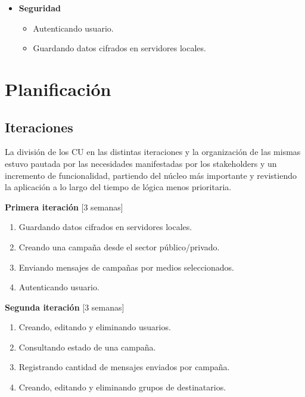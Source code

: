 \documentclass[a4paper, 10pt, twoside]{article}
\begin{document}
\begin{itemize}
\item \textbf{Seguridad}
\begin{itemize}
\item Autenticando usuario.
\item Guardando datos cifrados en servidores locales.
\end{itemize}
\end{itemize}

\newpage


\section{Planificación}

\subsection{Iteraciones}
La división de los CU en las distintas iteraciones y la organización de las mismas estuvo pautada por las necesidades manifestadas por los stakeholders y un incremento de funcionalidad, partiendo del núcleo más importante y revistiendo la aplicación a lo largo del tiempo de lógica menos prioritaria.

\textbf{Primera iteración} [3 semanas]
\begin{enumerate}
\item Guardando datos cifrados en servidores locales.
\item Creando una campaña desde el sector público/privado.
\item Enviando mensajes de campañas por medios seleccionados.
\item Autenticando usuario.
\end{enumerate}

\textbf{Segunda iteración} [3 semanas]
\begin{enumerate}
\item Creando, editando y eliminando usuarios.
\item Consultando estado de una campaña.
\item Registrando cantidad de mensajes enviados por campaña.
\item Creando, editando y eliminando grupos de destinatarios.
\end{enumerate}
\end{document}
